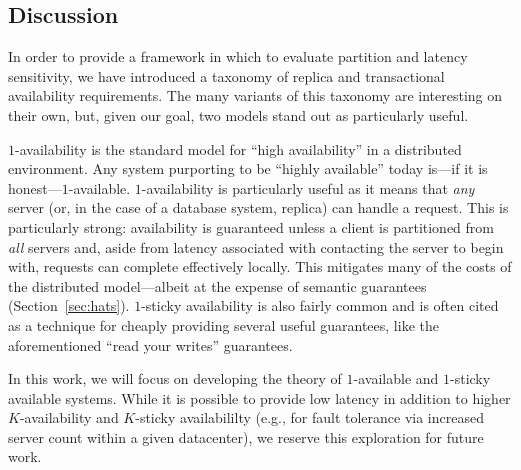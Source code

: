 \subsection{Discussion}

In order to provide a framework in which to evaluate partition and
latency sensitivity, we have introduced a taxonomy of replica and
transactional availability requirements. The many variants of this
taxonomy are interesting on their own, but, given our goal, two models
stand out as particularly useful.

$1$-availability is the standard model for ``high availability'' in a
distributed environment. Any system purporting to be ``highly
available'' today is---if it is
honest---$1$-available. $1$-availability is particularly useful as it
means that \textit{any} server (or, in the case of a database system,
replica) can handle a request. This is particularly strong:
availability is guaranteed unless a client is partitioned from
\textit{all} servers and, aside from latency associated with
contacting the server to begin with, requests can complete effectively
locally. This mitigates many of the costs of the distributed
model---albeit at the expense of semantic guarantees
(Section~\ref{sec:hats}). $1$-sticky availability is also fairly
common and is often cited as a technique for cheaply providing several
useful guarantees, like the aforementioned ``read your writes''
guarantees.

In this work, we will focus on developing the theory of $1$-available
and $1$-sticky available systems. While it is possible to provide low
latency in addition to higher $K$-availability and $K$-sticky
availabililty (e.g., for fault tolerance via increased server count
within a given datacenter), we reserve this exploration for future work.

